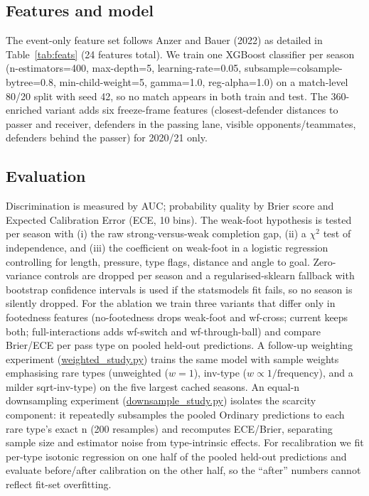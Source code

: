 \documentclass[11pt,a4paper]{article}
\begin{document}
\subsection{Features and model}
The event-only feature set follows Anzer and Bauer (2022) as detailed in Table~\ref{tab:feats} (24 features total). We train one XGBoost
classifier per season (n-estimators=400, max-depth=5,
learning-rate=0.05, subsample=colsample-bytree=0.8,
min-child-weight=5, gamma=1.0, reg-alpha=1.0) on a match-level 80/20
split with seed 42, so no match appears in both train and test. The
360-enriched variant adds six freeze-frame features (closest-defender
distances to passer and receiver, defenders in the passing lane, visible
opponents/teammates, defenders behind the passer) for 2020/21 only.

\subsection{Evaluation}
Discrimination is measured by AUC; probability quality by Brier score and
Expected Calibration Error (ECE, 10 bins). The weak-foot hypothesis is
tested per season with (i) the raw strong-versus-weak completion gap,
(ii) a $\chi^2$ test of independence, and (iii) the coefficient on
weak-foot in a logistic regression controlling for length,
pressure, type flags, distance and angle to goal. Zero-variance controls
are dropped per season and a regularised-sklearn fallback with bootstrap
confidence intervals is used if the statsmodels fit fails, so no season
is silently dropped. For the ablation we train three variants that differ
only in footedness features (no-footedness drops weak-foot and wf-cross; current keeps both; full-interactions adds wf-switch and wf-through-ball) and compare Brier/ECE per
pass type on pooled held-out predictions. A follow-up weighting experiment
(\url{weighted_study.py}) trains the same model with sample weights
emphasising rare types (unweighted ($w=1$),
inv-type ($w \propto 1/\mathrm{frequency}$), and a milder
sqrt-inv-type) on the five largest cached seasons. An equal-n downsampling experiment
(\url{downsample_study.py}) isolates the scarcity component: it repeatedly subsamples the pooled Ordinary predictions to each rare type's exact n (200 resamples) and recomputes ECE/Brier, separating sample size and estimator noise from type-intrinsic effects. For recalibration we fit
per-type isotonic regression on one half of the pooled held-out
predictions and evaluate before/after calibration on the other half, so
the ``after'' numbers cannot reflect fit-set overfitting.
\end{document}
